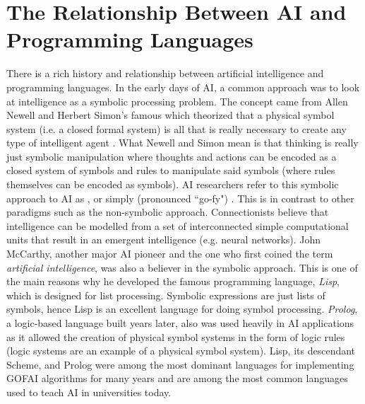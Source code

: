 \section{The Relationship Between AI and Programming Languages} 
There is a rich history and relationship between artificial intelligence and programming languages. In the early days of AI, a common approach was to look at intelligence as a symbolic processing problem. The concept came from Allen Newell and Herbert Simon's famous  which theorized that a physical symbol system (i.e. a closed formal system) is all that is really necessary to create any type of intelligent agent \citep{allennewell:symbolsystem}. What Newell and Simon mean is that thinking is really just symbolic manipulation where thoughts and actions can be encoded as a closed system of symbols and rules to manipulate said symbols (where rules themselves can be encoded as symbols). AI researchers refer to this symbolic approach to AI as ,  or simply  (pronounced ``go-fy") \citep{russellnorvig:ai}. This is in contrast to other paradigms such as the non-symbolic  approach. Connectionists believe that intelligence can be modelled from a set of interconnected simple computational units that result in an emergent intelligence (e.g. neural networks). John McCarthy, another major AI pioneer and the one who first coined the term \textit{artificial intelligence}, was also a believer in the symbolic approach. This is one of the main reasons why he developed the famous programming language, \textit{Lisp}, which is designed for list processing. Symbolic expressions are just lists of symbols, hence Lisp is an excellent language for doing symbol processing. \textit{Prolog}, a logic-based language built years later, also was used heavily in AI applications as it allowed the creation of physical symbol systems in the form of logic rules (logic systems are an example of a physical symbol system). Lisp, its descendant Scheme, and Prolog were among the most dominant languages for implementing GOFAI algorithms for many years and are among the most common languages used to teach AI in universities today.

